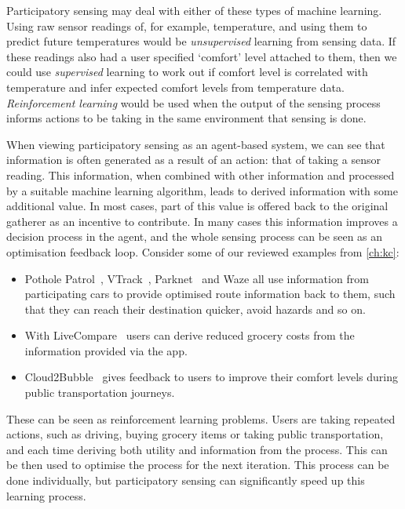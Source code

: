 Participatory sensing may deal with either of these types of machine learning.
Using raw sensor readings of, for example, temperature, and using them to
predict future temperatures would be \emph{unsupervised} learning from sensing
data. If these readings also had a user specified `comfort' level attached to
them, then we could use \emph{supervised} learning to work out if comfort
level is correlated with temperature and infer expected comfort levels from
temperature data. \emph{Reinforcement learning} would be used when the output
of the sensing process informs actions to be taking in the same environment
that sensing is done.

When viewing participatory sensing as an agent-based system, we can see that
information is often generated as a result of an action: that of taking a sensor
reading. This information, when combined with other information and processed
by a suitable machine learning algorithm, leads to derived information with
some additional value. In most cases, part of this value is offered back to
the original gatherer as an incentive to contribute. In many cases this
information improves a decision process in the agent, and the whole sensing
process can be seen as an optimisation feedback loop. Consider some of our
reviewed examples from \autoref{ch:kc}:

\begin{itemize}
\item Pothole Patrol~\citep{Eriksson2008}, VTrack~\citep{Thiagarajan2009}, Parknet~\citep{Mathur2010} and Waze all use information from participating cars to provide optimised route information back to them, such that they can reach their destination quicker, avoid hazards and so on.
\item With LiveCompare~\citep{Deng2009} users can derive reduced grocery costs from the information provided via the app.
\item Cloud2Bubble~\citep{Costa2012} gives feedback to users to improve their comfort levels during public transportation journeys.
\end{itemize}

These can be seen as reinforcement learning problems. Users are taking
repeated actions, such as driving, buying grocery items or taking public
transportation, and each time deriving both utility and information from the
process. This can be then used to optimise the process for the next iteration.
This process can be done individually, but participatory sensing can
significantly speed up this learning process.

